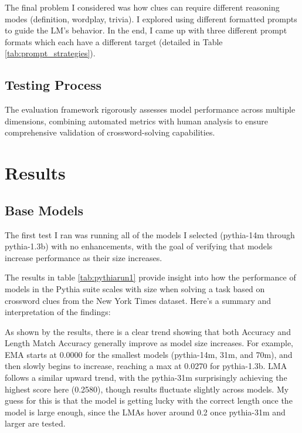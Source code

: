 \documentclass[
	a4paper, %
	10pt, %
	unnumberedsections, %
	twoside, %
]{LTJournalArticle}
\begin{document}
The final problem I considered was how clues can require different reasoning modes (definition, wordplay, trivia). I explored using different formatted prompts to guide the LM’s behavior. In the end, I came up with three different prompt formats which each have a different target (detailed in Table \ref{tab:prompt_strategies}).



\subsection{Testing Process}

The evaluation framework rigorously assesses model performance across multiple dimensions, combining automated metrics with human analysis to ensure comprehensive validation of crossword-solving capabilities.


\section{Results}

\subsection{Base Models}

The first test I ran was running all of the models I selected (pythia-14m through pythia-1.3b) with no enhancements, with the goal of verifying that models increase performance as their size increases.

The results in table \ref{tab:pythiarun1} provide insight into how the performance of models in the Pythia suite scales with size when solving a task based on crossword clues from the New York Times dataset. Here's a summary and interpretation of the findings:

As shown by the results, there is a clear trend showing that both Accuracy and Length Match Accuracy generally improve as model size increases. For example, EMA starts at 0.0000 for the smallest models (pythia-14m, 31m, and 70m), and then slowly begins to increase, reaching a max at 0.0270 for pythia-1.3b. LMA follows a similar upward trend, with the pythia-31m surprisingly achieving the highest score here (0.2580), though results fluctuate slightly across models. My guess for this is that the model is getting lucky with the correct length once the model is large enough, since the LMAs hover around 0.2 once pythia-31m and larger are tested.
\end{document}
